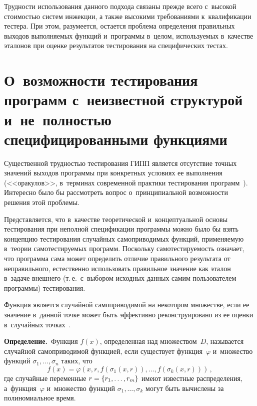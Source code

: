 \begin{multicols}{2}
    Трудности использования данного подхода связаны прежде всего 
с~высокой стоимостью систем инжекции, а также высокими требованиями 
к~квалификации тестера.
    При этом, разумеется, остается проблема определения правильных 
выходов выполняемых функций и~программы в~целом, используемых 
в~качестве эталонов при оценке результатов тестирования на специфических 
тестах.

\vspace*{-6pt}
    
\section{О~возможности тестирования программ с~неизвестной 
структурой и~не~полностью специфицированными функциями}

\vspace*{-2pt}
    
    Существенной трудностью тестирования ГИПП является отсутствие 
точных значений выходов программы при конкретных условиях ее 
выполнения (<<оракулов>>, в~терминах современной практики тес\-ти\-ро\-ва\-ния 
программ~\cite{4-bf}). Интересно было бы рассмотреть вопрос 
о~принципиальной воз\-мож\-ности решения этой проблемы.
    
    Представляется, что в~качестве теоретической и~концептуальной основы 
тестирования при неполной спецификации программы можно было бы\linebreak
 взять 
концепцию тестирования случайных самопри\-во\-ди\-мых функций, 
применяемую в~тео\-рии самотестируемых программ. Поскольку 
самотестируемость означает, что программа сама может определить отличие 
правильного результата от неправильного, естественно использовать 
правильное значение как эталон в~задаче внешнего (т.\,е.\ с~выбором 
исходных данных самим пользователем программы) тестирования.
    
    Функция является случайной самоприводимой на некотором множестве, 
если ее значение в~данной точке может быть эффективно реконструировано 
из ее оценки в~случайных точках~\cite{5-bf, 13-bf}.
    
    \smallskip
    
    \noindent
    \textbf{Определение.}\ Функция $f(x)$, определенная над 
множеством~$D$, называется случайной самоприводимой функцией, если 
существует функция~$\varphi$ и~множество функций $\sigma_1, \ldots , 
\sigma_n$ таких, что
    \begin{equation}
    f(x)=\varphi\left(x, r, f\left( \sigma_1\left(x,r\right)\right),\ldots , 
f\left(\sigma_k\left( x,r\right)\right)\right)\,,
    \label{e1-bs}
    \end{equation}
   где случайные переменные $r\hm=\{r_1, \ldots , r_m\}$ имеют известные 
распределения, а~функция~$\varphi$ и~множество функций $\sigma_1,\ldots , 
\sigma_k$ могут быть вычислены за полиномиальное время.


\end{multicols}
